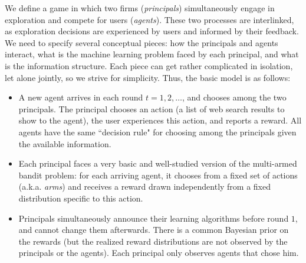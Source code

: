 


 We define a game in which two firms (\emph{principals}) simultaneously engage in exploration and compete for users (\emph{agents}). These two processes are interlinked, as exploration decisions are experienced by users and informed by their feedback. We need to specify several conceptual pieces: how the principals and agents interact, what is the machine learning problem faced by each principal, and what is the information structure. Each piece can get rather complicated in isolation, let alone jointly, so we strive for simplicity. Thus, the basic model is as follows:

\begin{itemize}

\item A new agent arrives in each round $t=1,2, \ldots$, and chooses among the two principals. The principal chooses an action (\eg a list of web search results to show to the agent), the user experiences this action, and reports a reward. All agents have the same ``decision rule" for choosing among the principals given the available information.

\item Each principal faces a very basic and well-studied version of the multi-armed bandit problem: for each arriving agent, it chooses from a fixed set of actions  (a.k.a. \emph{arms}) and receives a reward drawn independently from a fixed distribution specific to this action.

\item Principals simultaneously announce their learning algorithms before round $1$, and cannot change them afterwards. There is a common Bayesian prior on the rewards (but the realized reward distributions are not observed by the principals or the agents).  Each principal only observes agents that chose him. 
\end{itemize}

